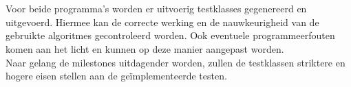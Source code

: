 
\\
\\
Voor beide programma's worden er uitvoerig testklasses gegenereerd en uitgevoerd. Hiermee kan de correcte werking en de nauwkeurigheid van de gebruikte algoritmes gecontroleerd worden. Ook eventuele programmeerfouten komen aan het licht en kunnen op deze manier aangepast worden. 
\\
Naar gelang de milestones uitdagender worden, zullen de testklassen striktere en hogere eisen stellen aan de ge\"implementeerde testen.